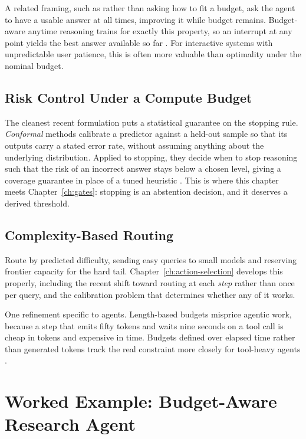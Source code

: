 A related framing, such as rather than asking how to fit a budget, ask the agent to have
a usable answer at all times, improving it while budget remains. Budget-aware
anytime reasoning trains for exactly this property, so an interrupt at any point
yields the best answer available so far \cite{anytime2026}. For interactive
systems with unpredictable user patience, this is often more valuable than
optimality under the nominal budget.

\subsection{Risk Control Under a Compute Budget}

The cleanest recent formulation puts a statistical guarantee on the stopping rule.
\emph{Conformal} methods calibrate a predictor against a held-out sample so that its outputs carry a stated error rate, without assuming anything about the underlying distribution. Applied to stopping, they decide when to stop reasoning such that the risk of an incorrect answer stays below a chosen level, giving a coverage guarantee in place of a tuned heuristic \cite{conformalthinking2026}. This is where this chapter meets
Chapter~\ref{ch:gates}: stopping is an abstention decision, and it deserves a
derived threshold.

\subsection{Complexity-Based Routing}

Route by predicted difficulty, sending easy queries to small models and reserving
frontier capacity for the hard tail. Chapter~\ref{ch:action-selection} develops
this properly, including the recent shift toward routing at each \emph{step}
rather than once per query, and the calibration problem that determines whether
any of it works.

One refinement specific to agents. Length-based budgets misprice agentic work,
because a step that emits fifty tokens and waits nine seconds on a tool call is
cheap in tokens and expensive in time. Budgets defined over elapsed time rather
than generated tokens track the real constraint more closely for tool-heavy
agents \cite{timelymachine2026}.

\section{Worked Example: Budget-Aware Research Agent}

